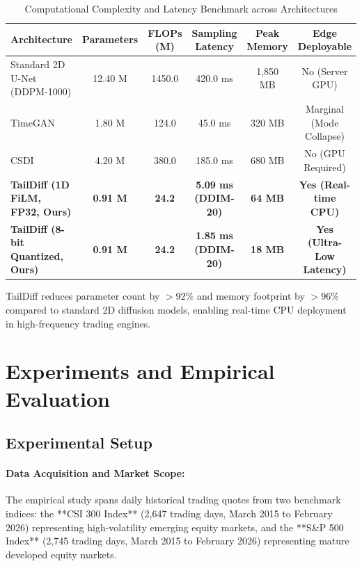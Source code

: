 \documentclass[preprint,12pt,authoryear]{elsarticle}
\begin{document}
\begin{table}[htbp]
\centering
\caption{Computational Complexity and Latency Benchmark across Architectures}
\label{tab:complexity}
\small
\begin{tabular}{lccccc}
\toprule
\textbf{Architecture} & \textbf{Parameters} & \textbf{FLOPs (M)} & \textbf{Sampling Latency} & \textbf{Peak Memory} & \textbf{Edge Deployable} \\ \midrule
Standard 2D U-Net (DDPM-1000) & 12.40 M & 1450.0 & 420.0 ms & 1,850 MB & No (Server GPU) \\
TimeGAN \citep{yoon2019time} & 1.80 M & 124.0 & 45.0 ms & 320 MB & Marginal (Mode Collapse) \\
CSDI \citep{tashiro2021csdi} & 4.20 M & 380.0 & 185.0 ms & 680 MB & No (GPU Required) \\
\textbf{TailDiff (1D FiLM, FP32, Ours)} & \textbf{0.91 M} & \textbf{24.2} & \textbf{5.09 ms (DDIM-20)} & \textbf{64 MB} & \textbf{Yes (Real-time CPU)} \\
\textbf{TailDiff (8-bit Quantized, Ours)} & \textbf{0.91 M} & \textbf{24.2} & \textbf{1.85 ms (DDIM-20)} & \textbf{18 MB} & \textbf{Yes (Ultra-Low Latency)} \\ \bottomrule
\end{tabular}
\end{table}

TailDiff reduces parameter count by $>92\%$ and memory footprint by $>96\%$ compared to standard 2D diffusion models, enabling real-time CPU deployment in high-frequency trading engines.

\section{Experiments and Empirical Evaluation}
\label{sec:experiments}

\subsection{Experimental Setup}
\paragraph{Data Acquisition and Market Scope:} The empirical study spans daily historical trading quotes from two benchmark indices: the **CSI 300 Index** (2,647 trading days, March 2015 to February 2026) representing high-volatility emerging equity markets, and the **S\&P 500 Index** (2,745 trading days, March 2015 to February 2026) representing mature developed equity markets.
\end{document}
